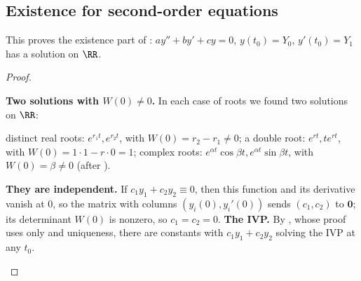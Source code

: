 \documentclass[10pt]{scrartcl}
\newcommand{\vv}[1]{\mathbf{#1}}
\begin{document}
\subsection{Existence for second-order equations}
This proves the existence part of : $ay''+by'+cy=0$, $y(t_0)=Y_0$, $y'(t_0)=Y_1$ has a solution on $\RR$.
\begin{proof}
  \begin{steps}
    \ii \textbf{Two solutions with $W(0)\neq 0$.} In each case of roots we found two solutions on $\RR$:
    \begin{itemize}
      \ii distinct real roots: $e^{r_1t},e^{r_2t}$, with $W(0)=r_2-r_1\neq 0$;
      \ii a double root: $e^{rt},te^{rt}$, with $W(0)=1\cdot 1-r\cdot 0=1$;
      \ii complex roots: $e^{\alpha t}\cos\beta t,e^{\alpha t}\sin\beta t$, with $W(0)=\beta\neq 0$ (after ).
    \end{itemize}
    \ii \textbf{They are independent.} If $c_1y_1+c_2y_2\equiv 0$, then this function and its derivative vanish at $0$, so the matrix with columns $(y_i(0),y_i'(0))$ sends $(c_1,c_2)$ to $\vv 0$; its determinant $W(0)$ is nonzero, so $c_1=c_2=0$.
    \ii \textbf{The IVP.} By , whose proof uses only  and uniqueness, there are constants with $c_1y_1+c_2y_2$ solving the IVP at any $t_0$. \qedhere
  \end{steps}
\end{proof}
\end{document}
